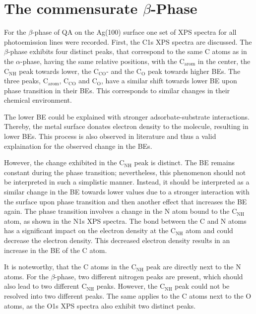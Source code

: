 \section{The commensurate \texorpdfstring{$\beta$}{beta}-Phase}

For the $\beta$-phase of \ac{QA} on the Ag(100) surface one set of \ac{XPS} spectra for all photoemission lines were recorded. First, the C1s \ac{XPS} spectra are discussed.
The $\beta$-phase exhibits four distinct peaks, that correspond to the same C atoms as in the $\alpha$-phase, having the same relative positions, with the $\mathrm{C_{arom}}$ in the center, the $\mathrm{C_{NH}}$ peak towards lower, the $\mathrm{C_{CO}}$- and the $\mathrm{C_{O}}$ peak towards higher \acp{BE}. The three peaks, $\mathrm{C_{arom}}$, $\mathrm{C_{CO}}$ and $\mathrm{C_{O}}$, have a similar shift towards lower \ac{BE} upon phase transition in their \acp{BE}. This corresponds to similar changes in their chemical environment.

The lower \ac{BE} could be explained with stronger adsorbate-substrate interactions. Thereby, the metal surface donates electron density to the molecule, resulting in lower \acp{BE}. This process is also observed in literature and thus a valid explaination for the observed change in the \acp{BE}.\autocite{Moulder1993}

However, the change exhibited in the $\mathrm{C_{NH}}$ peak is distinct. The \ac{BE} remains constant during the phase transition; nevertheless, this phenomenon should not be interpreted in such a simplistic manner. Instead, it should be interpreted as a similar change in the \ac{BE} towards lower values due to a stronger interaction with the surface upon phase transition and then another effect that increases the \ac{BE} again. The phase transition involves a change in the N atom bound to the $\mathrm{C_{NH}}$ atom, as shown in the N1s \ac{XPS} spectra. The bond between the C and N atoms has a significant impact on the electron density at the $\mathrm{C_{NH}}$ atom and could decrease the electron density. This decreased electron density results in an increase in the \ac{BE} of the C atom.

It is noteworthy, that the C atoms in the $\mathrm{C_{NH}}$ peak are directly next to the N atoms. For the $\beta$-phase, two different nitrogen peaks are present, which should also lead to two different $\mathrm{C_{NH}}$ peaks. However, the $\mathrm{C_{NH}}$ peak could not be resolved into two different peaks. The same applies to the C atoms next to the O atoms, as the O1s \ac{XPS} spectra also exhibit two distinct peaks. 

